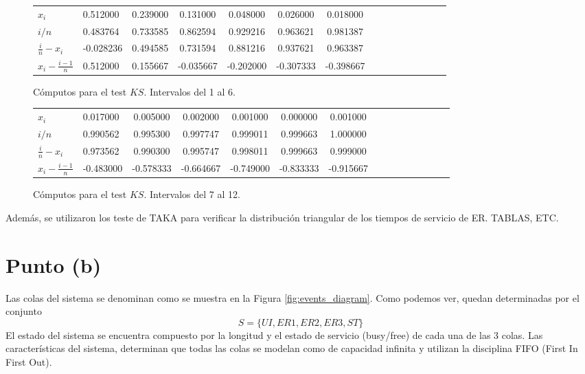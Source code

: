 \documentclass[a4paper,10pt]{article}
\begin{document}
\begin{figure}[h]
\begin{center}
\begin{tabular}{l|l*{12}{c}r}
\hline
$x_i$&0.512000&0.239000&0.131000&0.048000&0.026000&0.018000\\
$i/n$&0.483764&0.733585&0.862594&0.929216&0.963621&0.981387\\
$\frac{i}{n} - x_i$&-0.028236&0.494585&0.731594&0.881216&0.937621&0.963387\\
$x_i - \frac{i-1}{n}$&0.512000&0.155667&-0.035667&-0.202000&-0.307333&-0.398667\\
\hline
\end{tabular}
\caption{\label{tab:chi_table} Cómputos para el test $KS$. Intervalos del 1 al 6.}
\end{center}
\end{figure}

\begin{figure}[h]
\begin{center}
\begin{tabular}{l|l*{12}{c}r}
\hline
$x_i$&0.017000&0.005000&0.002000&0.001000&0.000000&0.001000\\
$i/n$&0.990562&0.995300&0.997747&0.999011&0.999663&1.000000\\
$\frac{i}{n} - x_i$&0.973562&0.990300&0.995747&0.998011&0.999663&0.999000\\
$x_i - \frac{i-1}{n}$&-0.483000&-0.578333&-0.664667&-0.749000&-0.833333&-0.915667\\
\hline
\end{tabular}
\caption{\label{tab:ks_table} Cómputos para el test $KS$. Intervalos del 7 al 12.}
\end{center}
\end{figure}

Además, se utilizaron los teste de TAKA para verificar la distribución triangular de los tiempos de servicio de ER. TABLAS, ETC.

\section{Punto (b)}
Las colas del sistema se denominan como se muestra en la Figura \ref{fig:events_diagram}. Como podemos ver, quedan
determinadas por el conjunto 
\[
S = \{UI, ER1, ER2, ER3, ST\}
\]
El estado del sistema se encuentra compuesto por la longitud y el estado de servicio (busy/free) de cada una de las 3 colas. Las características del sistema, determinan que todas las colas se modelan como de capacidad infinita y utilizan la disciplina FIFO (First In First Out).
\end{document}
